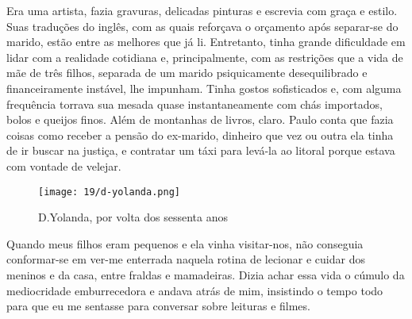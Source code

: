 Era uma artista, fazia gravuras, delicadas pinturas e escrevia com graça e estilo.
Suas traduções do inglês, com as quais reforçava o orçamento após separar-se do marido, estão entre as melhores que já li.
Entretanto, tinha grande dificuldade em lidar com a realidade cotidiana e, principalmente, com as restrições que a vida de mãe de três filhos, separada de um marido psiquicamente desequilibrado e financeiramente instável, lhe impunham.
Tinha gostos sofisticados e, com alguma frequência torrava sua mesada quase instantaneamente com chás importados, bolos e queijos finos.
Além de montanhas de livros, claro.
Paulo conta que fazia coisas como receber a pensão do ex-marido, dinheiro que vez ou outra ela tinha de ir buscar na justiça, e contratar um táxi para levá-la ao litoral porque estava com vontade de velejar.
 

\begin{figure}
\centering
\texttt{[image: 19/d-yolanda.png]}
\caption{D.Yolanda, por volta dos sessenta anos}
\end{figure}

Quando meus filhos eram pequenos e ela vinha visitar-nos, não conseguia conformar-se em ver-me enterrada naquela rotina de lecionar e cuidar dos meninos e da casa, entre fraldas e mamadeiras.
Dizia achar essa vida o cúmulo da mediocridade emburrecedora e andava atrás de mim, insistindo o tempo todo para que eu me sentasse para conversar sobre leituras e filmes.


